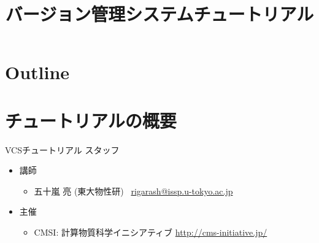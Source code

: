 \title{バージョン管理システムチュートリアル}




\begin{frame}
  \titlepage
\end{frame}

\section*{Outline}
\begin{frame}
  \tableofcontents
\end{frame}

\section{チュートリアルの概要}

\begin{frame}{VCSチュートリアル スタッフ}
  \begin{itemize}
  \item 講師
    \begin{itemize}
    \item 五十嵐 亮 (東大物性研) \ \href{mailto:rigarash@issp.u-tokyo.ac.jp}{rigarash@issp.u-tokyo.ac.jp}
    \end{itemize}
  \item 主催
    \begin{itemize}
    \item CMSI: 計算物質科学イニシアティブ \url{http://cms-initiative.jp/}
    \end{itemize}
  \end{itemize}
\end{frame}

